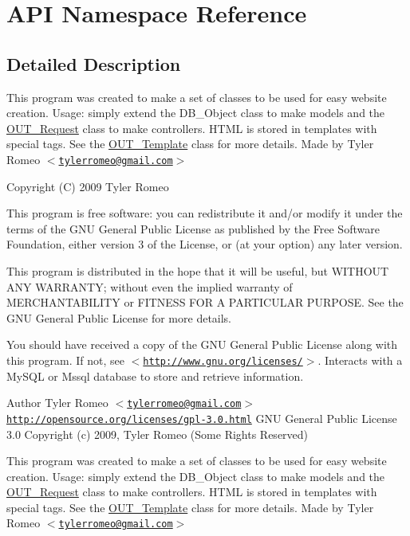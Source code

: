 \hypertarget{namespaceAPI}{
\section{API Namespace Reference}
\label{d1/d0e/namespaceAPI}
}


\subsection{Detailed Description}
This program was created to make a set of classes to be used for easy website creation. Usage: simply extend the DB\_\-Object class to make models and the \hyperlink{classOUT__Request}{OUT\_\-Request} class to make controllers. HTML is stored in templates with special tags. See the \hyperlink{classOUT__Template}{OUT\_\-Template} class for more details. Made by Tyler Romeo $<$\href{mailto:tylerromeo@gmail.com}{\tt tylerromeo@gmail.com}$>$

Copyright (C) 2009 Tyler Romeo

This program is free software: you can redistribute it and/or modify it under the terms of the GNU General Public License as published by the Free Software Foundation, either version 3 of the License, or (at your option) any later version.

This program is distributed in the hope that it will be useful, but WITHOUT ANY WARRANTY; without even the implied warranty of MERCHANTABILITY or FITNESS FOR A PARTICULAR PURPOSE. See the GNU General Public License for more details.

You should have received a copy of the GNU General Public License along with this program. If not, see $<$\href{http://www.gnu.org/licenses/}{\tt http://www.gnu.org/licenses/}$>$. Interacts with a MySQL or Mssql database to store and retrieve information.

\begin{DoxyAuthor}{Author}
Tyler Romeo $<$\href{mailto:tylerromeo@gmail.com}{\tt tylerromeo@gmail.com}$>$  \href{http://opensource.org/licenses/gpl-3.0.html}{\tt http://opensource.org/licenses/gpl-\/3.0.html} GNU General Public License 3.0  Copyright (c) 2009, Tyler Romeo (Some Rights Reserved)
\end{DoxyAuthor}
This program was created to make a set of classes to be used for easy website creation. Usage: simply extend the DB\_\-Object class to make models and the \hyperlink{classOUT__Request}{OUT\_\-Request} class to make controllers. HTML is stored in templates with special tags. See the \hyperlink{classOUT__Template}{OUT\_\-Template} class for more details. Made by Tyler Romeo $<$\href{mailto:tylerromeo@gmail.com}{\tt tylerromeo@gmail.com}$>$

